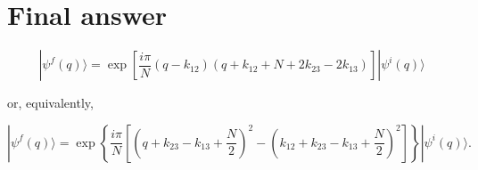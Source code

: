 \documentclass[11pt]{article}
\begin{document}
\section*{Final answer}


\[
\boxed{
|\psi^f(q)\rangle
=
\exp\!\left[
\frac{i\pi}{N}
(q-k_{12})
\left(
q+k_{12}+N+2k_{23}-2k_{13}
\right)
\right]
|\psi^i(q)\rangle
}
\]

or, equivalently,

\[
\boxed{
|\psi^f(q)\rangle
=
\exp\!\left\{
\frac{i\pi}{N}
\left[
\left(q+k_{23}-k_{13}+\frac N2\right)^2
-
\left(k_{12}+k_{23}-k_{13}+\frac N2\right)^2
\right]
\right\}
|\psi^i(q)\rangle .
}
\]
\end{document}
